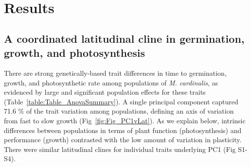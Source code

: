 \documentclass[11pt, oneside]{article}
\begin{document}

\section*{Results}

\subsection*{A coordinated latitudinal cline in germination, growth, and photosynthesis}

There are strong genetically-based trait differences in time to germination, growth, and photosynthetic rate among populations of \textit{M. cardinalis}, as evidenced by large and significant population effects for these traits (Table~\ref{table:Table_AnovaSummary}). A single principal component captured 71.6 \% of the trait variation among populations, defining an axis of variation from fast to slow growth (Fig~\ref{fig:Fig_PC1vLat}). As we explain below, intrinsic differences between populations in terms of plant function (photosynthesis) and performance (growth) contrasted with the low amount of variation in plasticity. There were similar latitudinal clines for individual traits underlying PC1 (Fig S1-S4).


\end{document}
